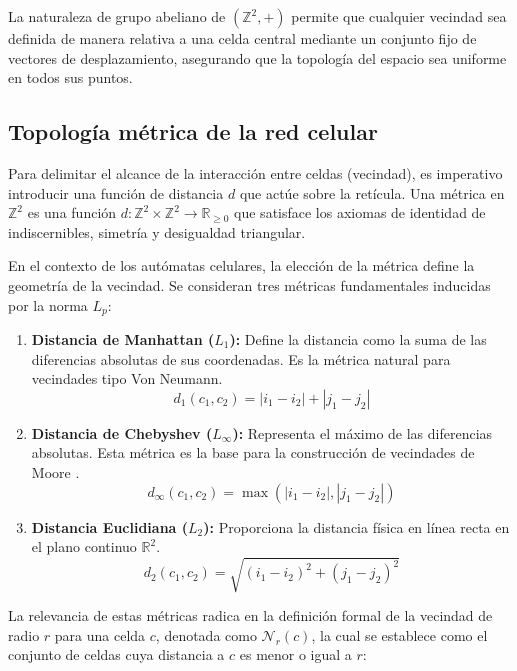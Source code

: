 La naturaleza de grupo abeliano de $(\mathbb{Z}^2, +)$ permite que cualquier vecindad sea definida de manera relativa a una celda central mediante un conjunto fijo de vectores de desplazamiento, asegurando que la topología del espacio sea uniforme en todos sus puntos.

\subsection{Topología métrica de la red celular}

Para delimitar el alcance de la interacción entre celdas (vecindad), es imperativo introducir una función de distancia $d$ que actúe sobre la retícula. Una métrica en $\mathbb{Z}^2$ es una función $d: \mathbb{Z}^2 \times \mathbb{Z}^2 \rightarrow \mathbb{R}_{\geq 0}$ que satisface los axiomas de identidad de indiscernibles, simetría y desigualdad triangular.

En el contexto de los autómatas celulares, la elección de la métrica define la geometría de la vecindad. Se consideran tres métricas fundamentales inducidas por la norma $L_p$:

\begin{enumerate}
    \item \textbf{Distancia de Manhattan ($L_1$):} Define la distancia como la suma de las diferencias absolutas de sus coordenadas. Es la métrica natural para vecindades tipo Von Neumann.
    \begin{equation}
        d_1(c_1, c_2) = |i_1 - i_2| + |j_1 - j_2|
    \end{equation}
    
    \item \textbf{Distancia de Chebyshev ($L_\infty$):} Representa el máximo de las diferencias absolutas. Esta métrica es la base para la construcción de vecindades de Moore \cite{Wolfram2002}.
    \begin{equation}
        d_\infty(c_1, c_2) = \max(|i_1 - i_2|, |j_1 - j_2|)
    \end{equation}
    
    \item \textbf{Distancia Euclidiana ($L_2$):} Proporciona la distancia física en línea recta en el plano continuo $\mathbb{R}^2$.
    \begin{equation}
        d_2(c_1, c_2) = \sqrt{(i_1 - i_2)^2 + (j_1 - j_2)^2}
    \end{equation}
\end{enumerate}

La relevancia de estas métricas radica en la definición formal de la vecindad de radio $r$ para una celda $c$, denotada como $\mathcal{N}_r(c)$, la cual se establece como el conjunto de celdas cuya distancia a $c$ es menor o igual a $r$:

